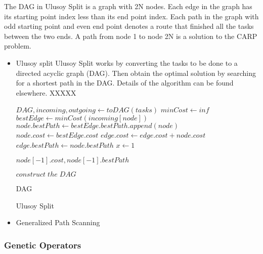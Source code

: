 \documentclass[conference]{IEEEtran}
\begin{document}
    The DAG in Ulusoy Split is a graph with 2N nodes. Each edge in the graph has its starting point index less than its end point index. Each path in the graph with odd starting point and even end point denotes a route that finished all the tasks between the two ends. A path from node 1 to node 2N is a solution to the CARP problem.
        \begin{itemize}
            \item Ulusoy split
            Ulusoy Split works by converting the tasks to be done to a directed acyclic graph (DAG). Then obtain the optimal solution by searching for a shortest path in the DAG. Details of the algorithm can be found elsewhere. XXXXX
            \begin{algorithm}[H]
            \begin{algorithmic}[1]
                \State $DAG, incoming, outgoing \gets toDAG(tasks)$
                \State $minCost \gets inf$
                \State $bestEdge \gets minCost(incoming[node])$
                \State $node.bestPath \gets bestEdge.bestPath.append(node)$
                \State $node.cost \gets bestEdge.cost$
                    \State $edge.cost \gets edge.cost+node.cost$
                    \State $edge.bestPath \gets node.bestPath$
                \EndFor
                \EndFor
                \State $x \gets 1$
                
                \Return $node[-1].cost, node[-1].bestPath$
                \EndFunction

                \State $construct\; the\; DAG$
                
                \Return DAG
                \EndFunction
            \end{algorithmic}
            \caption{Ulusoy Split}
            \end{algorithm}
            \item Generalized Path Scanning
            
            
        \end{itemize}

    \subsubsection{Genetic Operators}
\end{document}
